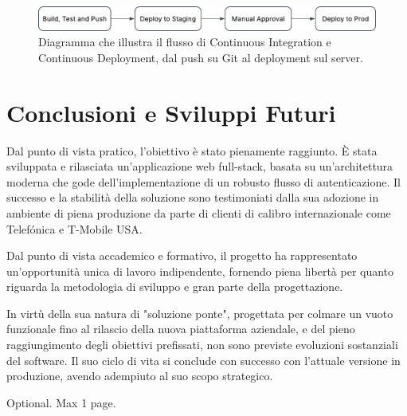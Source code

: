 \documentclass[12pt,a4paper,openright,twoside]{book}
\begin{document}
\begin{figure}[H]
    \centering
    \includegraphics[width=\textwidth]{figures/workflow.pdf}
    \caption{Diagramma che illustra il flusso di Continuous Integration e Continuous Deployment, dal push su Git al deployment sul server.}
    \label{fig:ci_cd_diagram}
\end{figure}



\chapter{Conclusioni e Sviluppi Futuri}
\label{chap:conclusioni}

Dal punto di vista pratico, l'obiettivo è stato pienamente raggiunto. È stata sviluppata e rilasciata un'applicazione web full-stack, basata su un'architettura moderna che gode dell'implementazione di un robusto flusso di autenticazione. Il successo e la stabilità della soluzione sono testimoniati dalla sua adozione in ambiente di piena produzione da parte di clienti di calibro internazionale come Telefónica e T-Mobile USA.

Dal punto di vista accademico e formativo, il progetto ha rappresentato un'opportunità unica di lavoro indipendente, fornendo piena libertà per quanto riguarda la metodologia di sviluppo e gran parte della progettazione.

In virtù della sua natura di "soluzione ponte", progettata per colmare un vuoto funzionale fino al rilascio della nuova piattaforma aziendale, e del pieno raggiungimento degli obiettivi prefissati, non sono previste evoluzioni sostanziali del software. Il suo ciclo di vita si conclude con successo con l'attuale versione in produzione, avendo adempiuto al suo scopo strategico.


\backmatter





\begin{acknowledgements}
    Optional. Max 1 page.
\end{acknowledgements}
\end{document}
